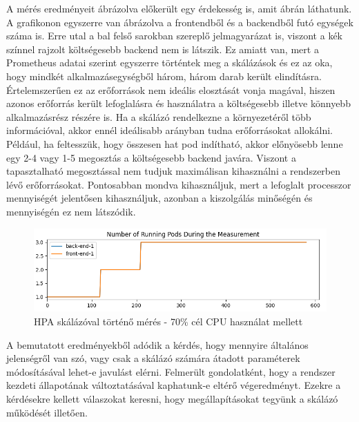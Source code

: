 A mérés eredményeit ábrázolva előkerült egy érdekesség is, amit  ábrán láthatunk.
A grafikonon egyszerre van ábrázolva a frontendből és a backendből futó egységek száma is.
Erre utal a bal felső sarokban szereplő jelmagyarázat is, viszont a kék színnel rajzolt költségesebb backend nem is látszik.
Ez amiatt van, mert a Prometheus adatai szerint egyszerre történtek meg a skálázások és ez az oka, hogy mindkét alkalmazásegységből három, három darab került elindításra.
Értelemszerűen ez az erőforrások nem ideális elosztását vonja magával, hiszen azonos erőforrás került lefoglalásra és használatra a költségesebb illetve könnyebb alkalmazásrész részére is.
Ha a skálázó rendelkezne a környezetéről több információval, akkor ennél ideálisabb arányban tudna erőforrásokat allokálni.
Például, ha feltesszük, hogy összesen hat pod indítható, akkor előnyösebb lenne egy 2-4 vagy 1-5 megosztás a költségesebb backend javára.
Viszont a tapasztalható megosztással nem tudjuk maximálisan kihasználni a rendszerben lévő erőforrásokat.
Pontosabban mondva kihasználjuk, mert a lefoglalt processzor mennyiségét jelentősen kihasználjuk, azonban a kiszolgálás minőségén és mennyiségén ez nem látszódik.

\begin{figure}[!ht]
	\centering
	\includegraphics[width=150mm, keepaspectratio]{figures/HPA-scaling-in-the-same-time.png}
	\caption{HPA skálázóval történő mérés - 70\% cél CPU használat mellett}
	\label{fig:HPA-scaling-same-time}
\end{figure}

A bemutatott eredményekből adódik a kérdés, hogy mennyire általános jelenségről van szó, vagy csak a skálázó számára átadott paraméterek módosításával lehet-e javulást elérni.
Felmerült gondolatként, hogy a rendszer kezdeti állapotának változtatásával kaphatunk-e eltérő végeredményt.
Ezekre a kérdésekre kellett válaszokat keresni, hogy megállapításokat tegyünk a skálázó működését illetően.


